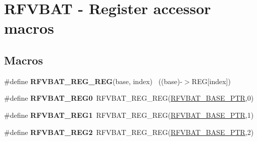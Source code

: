 \hypertarget{group___r_f_v_b_a_t___register___accessor___macros}{}\section{R\+F\+V\+B\+A\+T -\/ Register accessor macros}
\label{group___r_f_v_b_a_t___register___accessor___macros}
\subsection*{Macros}
\begin{DoxyCompactItemize}
\item 
\hypertarget{group___r_f_v_b_a_t___register___accessor___macros_ga8c8b6cb4ceddcf6be9717e473a265aba}{}\#define {\bfseries R\+F\+V\+B\+A\+T\+\_\+\+R\+E\+G\+\_\+\+R\+E\+G}(base,  index)                          ~((base)-\/$>$R\+E\+G\mbox{[}index\mbox{]})\label{group___r_f_v_b_a_t___register___accessor___macros_ga8c8b6cb4ceddcf6be9717e473a265aba}

\item 
\hypertarget{group___r_f_v_b_a_t___register___accessor___macros_gab2c2deaa663210dcbe5b3c7c9dd3c279}{}\#define {\bfseries R\+F\+V\+B\+A\+T\+\_\+\+R\+E\+G0}~R\+F\+V\+B\+A\+T\+\_\+\+R\+E\+G\+\_\+\+R\+E\+G(\hyperlink{group___r_f_v_b_a_t___peripheral_ga5b6418d9be20f84b2190ccf6134b7ba3}{R\+F\+V\+B\+A\+T\+\_\+\+B\+A\+S\+E\+\_\+\+P\+T\+R},0)\label{group___r_f_v_b_a_t___register___accessor___macros_gab2c2deaa663210dcbe5b3c7c9dd3c279}

\item 
\hypertarget{group___r_f_v_b_a_t___register___accessor___macros_gaad1d344fc43c23927596453cbbfbe87f}{}\#define {\bfseries R\+F\+V\+B\+A\+T\+\_\+\+R\+E\+G1}~R\+F\+V\+B\+A\+T\+\_\+\+R\+E\+G\+\_\+\+R\+E\+G(\hyperlink{group___r_f_v_b_a_t___peripheral_ga5b6418d9be20f84b2190ccf6134b7ba3}{R\+F\+V\+B\+A\+T\+\_\+\+B\+A\+S\+E\+\_\+\+P\+T\+R},1)\label{group___r_f_v_b_a_t___register___accessor___macros_gaad1d344fc43c23927596453cbbfbe87f}

\item 
\hypertarget{group___r_f_v_b_a_t___register___accessor___macros_ga2cb98ee1f823c18c81f270beb24b359a}{}\#define {\bfseries R\+F\+V\+B\+A\+T\+\_\+\+R\+E\+G2}~R\+F\+V\+B\+A\+T\+\_\+\+R\+E\+G\+\_\+\+R\+E\+G(\hyperlink{group___r_f_v_b_a_t___peripheral_ga5b6418d9be20f84b2190ccf6134b7ba3}{R\+F\+V\+B\+A\+T\+\_\+\+B\+A\+S\+E\+\_\+\+P\+T\+R},2)\label{group___r_f_v_b_a_t___register___accessor___macros_ga2cb98ee1f823c18c81f270beb24b359a}


\end{DoxyCompactItemize}
